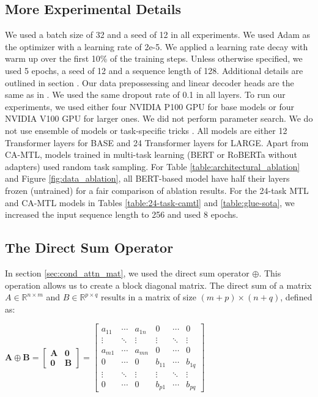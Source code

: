 \documentclass{article} \usepackage{iclr2021_conference,times}
\begin{document}
\subsection{More Experimental Details}
\label{append:more_xp_details}
We used a batch size of 32 and a seed of 12 in all experiments. We used Adam \citep{Kingma2015AdamAM} as the optimizer with a learning rate of 2e-5. We applied a learning rate decay with warm up over the first 10\% of the training steps. Unless otherwise specified, we used 5 epochs, a seed of 12 and a sequence length of 128. Additional details are outlined in section . Our data prepossessing and linear decoder heads are the same as in \citet{bert}. We used the same dropout rate of 0.1 in all layers. To run our experiments, we used either four NVIDIA P100 GPU for base models or four NVIDIA V100 GPU for larger ones. We did not perform parameter search. We do not use ensemble of models or task-specific tricks \citep{bert,mtl_bert_liu2019,mtl_bert_clark2019}. All models are either 12 Transformer layers for BASE and 24 Transformer layers for LARGE. Apart from CA-MTL, models trained in multi-task learning (BERT or RoBERTa without adapters) used random task sampling. For Table \ref{table:architectural_ablation} and Figure \ref{fig:data_ablation}, all BERT-based model have half their layers frozen (untrained) for a fair comparison of ablation results. For the 24-task MTL and CA-MTL models in Tables \ref{table:24-task-camtl} and \ref{table:glue-sota}, we increased the input sequence length to 256 and used 8 epochs. 

\subsection{The Direct Sum Operator}
\label{append:directsum}
In section \ref{sec:cond_attn_mat}, we used the direct sum operator $\oplus$. This operation allows us to create a block diagonal matrix. The direct sum of a matrix $A \in \mathbb{R}^{n\times m}$ and $B \in \mathbb{R}^{p\times q}$ results in a matrix of size  $(m + p) \times (n + q)$, defined as:\newline
\begin{center}
$\mathbf{A} \oplus \mathbf{B} =
  \begin{bmatrix} \mathbf{A} & \boldsymbol{0} \\ \boldsymbol{0} & \mathbf{B} \end{bmatrix} =
  \begin{bmatrix}
     a_{11} & \cdots & a_{1n} &      0 & \cdots &      0 \\
     \vdots & \ddots & \vdots & \vdots & \ddots & \vdots \\
    a_{m 1} & \cdots & a_{mn} &      0 & \cdots &      0 \\
          0 & \cdots &      0 & b_{11} & \cdots &  b_{1q} \\
     \vdots & \ddots & \vdots & \vdots & \ddots & \vdots \\
          0 & \cdots &      0 & b_{p1} & \cdots &  b_{pq}
  \end{bmatrix}$
\end{center}
\end{document}
